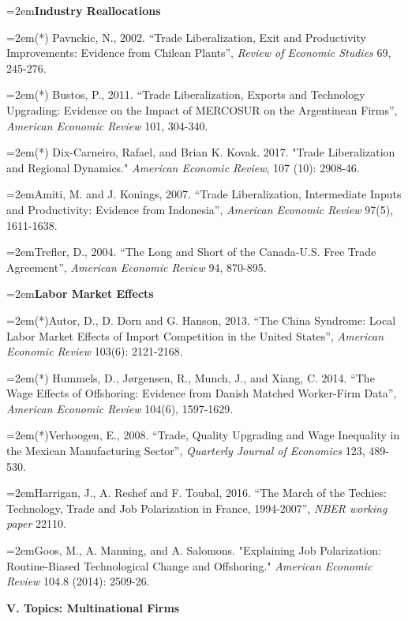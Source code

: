 \documentclass[10pt]{article}
\newcommand{\reading}{\par\hangindent=2em\hangafter=1\noindent}
\newenvironment{readingsblock}{%
  \begin{adjustwidth}{2em}{0pt} %
}{%
  \end{adjustwidth}
}
\begin{document}
  \begin{readingsblock}
  
  \reading \textbf{Industry Reallocations} \\[4pt]
  
  \reading (*) Pavnckic, N., 2002. “Trade Liberalization, Exit and Productivity Improvements: Evidence from Chilean Plants”, {\it Review of Economic Studies} 69, 245-276.
  \reading (*) Bustos, P., 2011. “Trade Liberalization, Exports and Technology Upgrading: Evidence on the Impact of MERCOSUR on the Argentinean Firms”, {\it American Economic Review} 101, 304-340.
  \reading (*) Dix-Carneiro, Rafael, and Brian K. Kovak. 2017. "Trade Liberalization and Regional Dynamics." {\it American Economic Review}, 107 (10): 2908-46.
  \reading Amiti, M. and J. Konings, 2007. “Trade Liberalization, Intermediate Inputs and Productivity: Evidence from Indonesia”, {\it American Economic Review} 97(5), 1611-1638.
  \reading Trefler, D., 2004. “The Long and Short of the Canada-U.S. Free Trade Agreement”, {\it American Economic Review} 94, 870-895. \\[4pt]
  
  
  \reading \textbf{Labor Market Effects} \\[4pt]
  
  \reading (*)Autor, D., D. Dorn and G. Hanson, 2013. “The China Syndrome: Local Labor Market Effects of Import Competition in the United States”, {\it American Economic Review} 103(6): 2121-2168.
  \reading (*) Hummels, D., Jørgensen, R., Munch, J., and Xiang, C. 2014. “The Wage Effects of Offshoring: Evidence from Danish Matched Worker-Firm Data”, {\it American Economic Review} 104(6), 1597-1629.
  \reading (*)Verhoogen, E., 2008. “Trade, Quality Upgrading and Wage Inequality in the Mexican Manufacturing Sector”, {\it Quarterly Journal of Economics} 123, 489-530. 
  \reading Harrigan, J., A. Reshef and F. Toubal, 2016. “The March of the Techies: Technology, Trade and Job Polarization in France, 1994-2007”, {\it NBER working paper} 22110.
  \reading Goos, M., A. Manning, and A. Salomons. "Explaining Job Polarization: Routine-Biased Technological Change and Offshoring." {\it American Economic Review} 104.8 (2014): 2509-26. \\[4pt]
  \end{readingsblock}
  
  
\noindent \textbf{V. Topics: Multinational Firms} \\[6pt]
\end{document}
